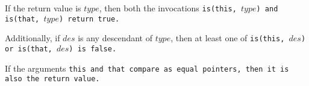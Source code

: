 If the return value is $type$, then both the invocations \tt{is(this,}
$type$\tt{)} and \tt{is(that,} $type$\tt{)} return \tt{true}.

\noindent Additionally, if $des$ is any descendant of $type$, then at least
one of \tt{is(this,} $des$\tt{)} or \tt{is(that,} $des$\tt{)} is \tt{false}.

\note If the arguments \tt{this} and \tt{that} compare
as equal pointers, then it is also the return value.
